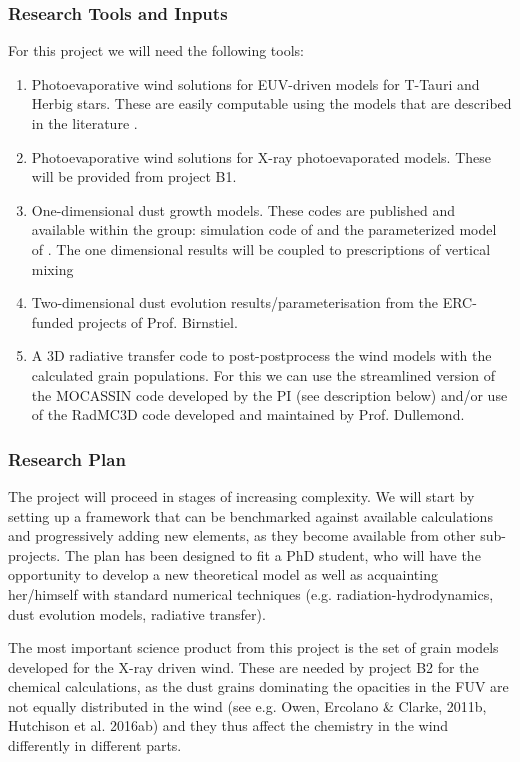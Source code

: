 \documentclass[10pt,fleqn,twoside]{article}
\begin{document}
\subsubsection{Research Tools and Inputs}

For this project we will need the following tools:
\begin{enumerate}
\item Photoevaporative wind solutions for EUV-driven
models for T-Tauri and Herbig stars. These are easily computable 
using the models that are described in the literature \citep[e.g.,][]{2004ApJ...607..890F}.
\item Photoevaporative wind solutions for X-ray photoevaporated
models. These will be provided from project B1.
\item One-dimensional dust growth models. These codes are published
and available within the group: simulation code of 
 \citet{2010A&A...513A..79B} and the parameterized model of
 \citet{2012A&A...539A.148B}. The one dimensional results will be
 coupled to prescriptions of vertical mixing \citep[e.g.]{2009A&A...496..597F}
\item Two-dimensional dust evolution results/parameterisation from the
  ERC-funded projects of Prof. Birnstiel.
\item A 3D radiative transfer code to post-postprocess the wind
models with the calculated grain populations. For this we can use the
streamlined version of the {\sc MOCASSIN} code developed by the PI
(see description below) and/or use  of the
RadMC3D code developed and maintained by Prof. Dullemond. 
\end{enumerate}

\subsubsection{Research Plan} 

The project will proceed in stages of increasing complexity. We will start
by setting up a framework that can be benchmarked against available
calculations and progressively adding new elements, as they become
available from other sub-projects. The plan has been designed to fit a
PhD student, who will have the opportunity to develop a new theoretical
model as well as acquainting her/himself with standard numerical
techniques (e.g. radiation-hydrodynamics, dust evolution models,
radiative transfer). 

The most important science product from this project is the set of
grain models developed for the  X-ray driven wind. These are needed by
project B2 for the chemical calculations, as the dust
grains dominating the opacities in the FUV are not equally distributed
in the wind (see e.g. Owen, Ercolano \& Clarke, 2011b, Hutchison et
al. 2016ab) and they thus affect the chemistry in the wind
differently in different parts. 
\end{document}
